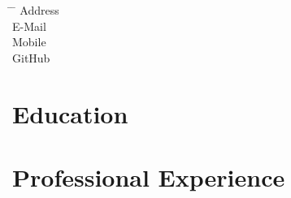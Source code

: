 \documentclass[12pt]{report} %
\begin{document}






\begin{tabbing}
\hspace{3cm} \= \hspace{4cm} \= \kill %
Address \> \varAddress\\
E-Mail  \> \href{mailto:\varEmail}{\varEmail} \\
Mobile  \> \varMobile \\
\DoIfNotEmpty{\varGithub}
{GitHub \> \href{\varGithub}{\varGithub} \\}%
\end{tabbing}



\section{Education}

\education{}
\begin{list}{}%
         {\setlength{\leftmargin}{0.19\linewidth}}%
         \item[]%
{\small{\color{gray}\varEducationInfo{}}}
\end{list}


\section{Professional Experience}

\professional{}

\end{document}
